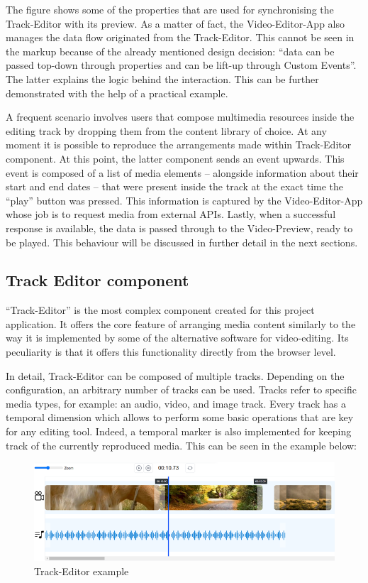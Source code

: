 The figure shows some of the properties that are used for synchronising the Track-Editor with its preview. As a matter of fact, the Video-Editor-App also manages the data flow originated from the Track-Editor. This cannot be seen in the markup because of the already mentioned design decision: “data can be passed top-down through properties and can be lift-up through Custom Events”. The latter explains the logic behind the interaction. This can be further demonstrated with the help of a practical example.

A frequent scenario involves users that compose multimedia resources inside the editing track by dropping them from the content library of choice. At any moment it is possible to reproduce the arrangements made within Track-Editor component. At this point, the latter component sends an event upwards. This event is composed of a list of media elements – alongside information about their start and end dates – that were present inside the track at the exact time the “play” button was pressed. This information is captured by the Video-Editor-App whose job is to request media from external APIs. Lastly, when a successful response is available, the data is passed through to the Video-Preview, ready to be played. This behaviour will be discussed in further detail in the next sections.

\subsection{Track Editor component}
\label{subsec:trackEditpr}

“Track-Editor” is the most complex component created for this project application. It offers the core feature of arranging media content similarly to the way it is implemented by some of the alternative software for video-editing. Its peculiarity is that it offers this functionality directly from the browser level.

In detail, Track-Editor can be composed of multiple tracks. Depending on the configuration, an arbitrary number of tracks can be used. Tracks refer to specific media types, for example: an audio, video, and image track. Every track has a temporal dimension which allows to perform some basic operations that are key for any editing tool. Indeed, a temporal marker is also implemented for keeping track of the currently reproduced media. This can be seen in the example below:

\begin{figure}[H]
\centering
\includegraphics[width=1\textwidth]{images/TrackEditor.png}
\caption{Track-Editor example}
\label{fig:trackEditor}
\end{figure}

